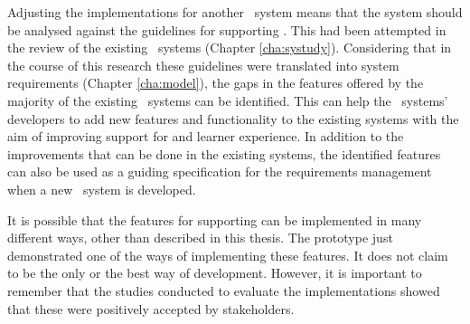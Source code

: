 Adjusting the implementations for another \ep~system means that the system
should be analysed against the guidelines for supporting \LLLsn. This had been
attempted in the review of the existing \ep~systems (Chapter \ref{cha:systudy}).
Considering that in the course of this research these guidelines were translated
into system requirements (Chapter \ref{cha:model}), the gaps in the features
offered by the majority of the existing \ep~systems can be identified. This can
help the \ep~systems' developers to add new features and functionality to the
existing systems with the aim of improving support for \LLLs and learner
experience. In addition to the improvements that can be done in the existing
systems, the identified features can also be used as a guiding specification for
the requirements management when a new \ep~system is developed.

It is possible that the features for supporting \LLLs can be implemented in many
different ways, other than described in this thesis. The prototype just
demonstrated one of the ways of implementing these features. It does not claim
to be the only or the best way of development. However, it is important to
remember that the studies conducted to evaluate the implementations showed that
these were positively accepted by stakeholders.
